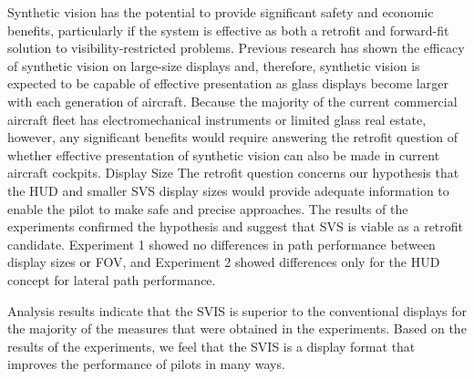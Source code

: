 \documentclass[utf8,bachelor,manualbib]{gradu3}
\begin{document}
Synthetic vision has the potential to provide significant safety and economic benefits,
particularly if the system is effective as both a retrofit and forward-fit solution
to visibility-restricted problems. Previous research has shown the efficacy of synthetic
vision on large-size displays and, therefore, synthetic vision is expected to
be capable of effective presentation as glass displays become larger with each generation
of aircraft. Because the majority of the current commercial aircraft fleet has
electromechanical instruments or limited glass real estate, however, any significant
benefits would require answering the retrofit question of whether effective
presentation of synthetic vision can also be made in current aircraft cockpits.
Display Size
The retrofit question concerns our hypothesis that the HUD and smaller SVS display
sizes would provide adequate information to enable the pilot to make safe and
precise approaches. The results of the experiments confirmed the hypothesis and
suggest that SVS is viable as a retrofit candidate. Experiment 1 showed no differences
in path performance between display sizes or FOV, and Experiment 2
showed differences only for the HUD concept for lateral path performance. \citep{prinzel2004}

Analysis results indicate that the SVIS is superior to the conventional displays
for the majority of the measures that were obtained in the experiments.
Based on the results of the experiments, we feel that the SVIS is a display format
that improves the performance of pilots in many ways. \citep{schnellym2004}
\end{document}
